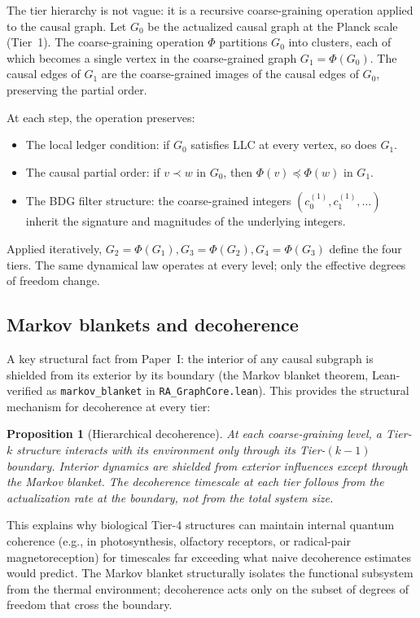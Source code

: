 \documentclass[11pt]{article}
\newtheorem{proposition}{Proposition}
\begin{document}
The tier hierarchy is not vague: it is a recursive coarse-graining operation applied to the causal graph. Let $G_0$ be the actualized causal graph at the Planck scale (Tier~1). The coarse-graining operation $\Phi$ partitions $G_0$ into clusters, each of which becomes a single vertex in the coarse-grained graph $G_1 = \Phi(G_0)$. The causal edges of $G_1$ are the coarse-grained images of the causal edges of $G_0$, preserving the partial order.

At each step, the operation preserves:
\begin{itemize}[nosep]
\item The local ledger condition: if $G_0$ satisfies LLC at every vertex, so does $G_1$.
\item The causal partial order: if $v \prec w$ in $G_0$, then $\Phi(v) \preceq \Phi(w)$ in $G_1$.
\item The BDG filter structure: the coarse-grained integers $(c_0^{(1)}, c_1^{(1)}, \ldots)$ inherit the signature and magnitudes of the underlying integers.
\end{itemize}

Applied iteratively, $G_2 = \Phi(G_1), G_3 = \Phi(G_2), G_4 = \Phi(G_3)$ define the four tiers. The same dynamical law operates at every level; only the effective degrees of freedom change.

\subsection{Markov blankets and decoherence}
\label{sec:markov_blanket}

A key structural fact from Paper~I: the interior of any causal subgraph is shielded from its exterior by its boundary (the Markov blanket theorem, Lean-verified as \texttt{markov\_blanket} in \texttt{RA\_GraphCore.lean}). This provides the structural mechanism for decoherence at every tier:

\begin{proposition}[Hierarchical decoherence]
\label{prop:hierarchical_decoherence}
At each coarse-graining level, a Tier-$k$ structure interacts with its environment only through its Tier-$(k-1)$ boundary. Interior dynamics are shielded from exterior influences except through the Markov blanket. The decoherence timescale at each tier follows from the actualization rate at the boundary, not from the total system size.
\end{proposition}

This explains why biological Tier-4 structures can maintain internal quantum coherence (e.g., in photosynthesis, olfactory receptors, or radical-pair magnetoreception) for timescales far exceeding what naive decoherence estimates would predict. The Markov blanket structurally isolates the functional subsystem from the thermal environment; decoherence acts only on the subset of degrees of freedom that cross the boundary.
\end{document}
